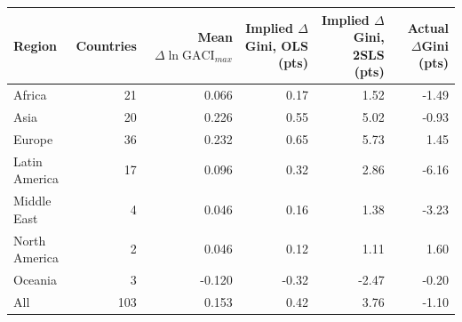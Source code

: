 \begin{tabular}{lrrrrr}
\toprule
Region & Countries & Mean $\Delta\ln\mathrm{GACI}_{max}$ & Implied $\Delta$Gini, OLS (pts) & Implied $\Delta$Gini, 2SLS (pts) & Actual $\Delta$Gini (pts) \\
\midrule
Africa & 21 & 0.066 & 0.17 & 1.52 & -1.49 \\
Asia & 20 & 0.226 & 0.55 & 5.02 & -0.93 \\
Europe & 36 & 0.232 & 0.65 & 5.73 & 1.45 \\
Latin America & 17 & 0.096 & 0.32 & 2.86 & -6.16 \\
Middle East & 4 & 0.046 & 0.16 & 1.38 & -3.23 \\
North America & 2 & 0.046 & 0.12 & 1.11 & 1.60 \\
Oceania & 3 & -0.120 & -0.32 & -2.47 & -0.20 \\
\midrule All & 103 & 0.153 & 0.42 & 3.76 & -1.10 \\
\bottomrule
\end{tabular}
